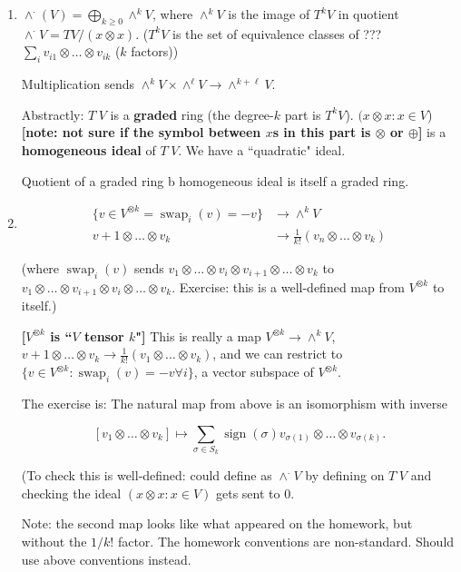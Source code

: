\begin{exercise}

\begin{enumerate}

\item

\(\wedge^\cdot (V) = \bigoplus_{k \geq 0} \wedge^k V\), where \(\wedge^k V\) is the image of \(T^k V\) in quotient \(\wedge^\cdot V = TV/(x \otimes x)\). (\(T^k V\) is the set of equivalence classes of ??? \(\sum_i v_{i1} \otimes \ldots \otimes v_{ik}\) (\(k\) factors))


Multiplication sends \(\wedge^k V \times \wedge^\ell V \to \wedge^{k + \ell} V\).

Abstractly: \(T^\cdot V\) is a \textbf{graded} ring (the degree-\(k\) part is \(T^k V\)). \((x \otimes x: x \in V\)) \textbf{[note: not sure if the symbol between \(x\)s in this part is \(\otimes\) or \(\oplus\)]} is a \textbf{homogeneous ideal} of \(T^\cdot V\). We have a ``quadratic" ideal.

Quotient of a graded ring b homogeneous ideal is itself a graded ring.

\item 

\begin{align*}
\{v \in V^{\otimes k} = \operatorname{swap}_i(v) = -v\} & \to \wedge^k V
\\ v+1 \otimes \ldots \otimes v_k & \to \frac{1}{k!} (v_n \otimes \ldots \otimes v_k)
\end{align*}

(where \( \operatorname{swap}_i(v) \) sends \(v_1 \otimes \ldots \otimes v_i \otimes v_{i+1} \otimes \ldots \otimes v_k\) to \(v_1 \otimes \ldots \otimes v_{i+1} \otimes v_{i} \otimes \ldots \otimes v_k\). Exercise: this is a well-defined map from \(V^{\otimes k}\) to itself.)

\textbf{[\(V^{\otimes k} \) is ``\(V\) tensor \(k\)"]} This is really a map \(V^{\otimes k} \to \wedge^k V\), \(v+1 \otimes \ldots \otimes v_k \to \frac{1}{k!} (v_1 \otimes \ldots \otimes v_k)\), and we can restrict to \(\{v \in V^{\otimes k} : \operatorname{swap}_i(v) = -v \forall i\}\), a vector subspace of \(V^{\otimes k}\). 

The exercise is: The natural map from above is an isomorphism with inverse 

\[
[v_1 \otimes \ldots \otimes v_k] \mapsto \sum_{\sigma \in S_k} \operatorname{sign}(\sigma) v_{\sigma(1)} \otimes \ldots \otimes v_{\sigma(k)}.
\]

(To check this is well-defined: could define as \(\wedge^\cdot V\) by defining on \(T^\cdot V\) and checking the ideal \((x \otimes x: x \in V)\) gets sent to 0.

Note: the second map looks like what appeared on the homework, but without the \(1/k!\) factor. The homework conventions are non-standard. Should use above conventions instead.

\end{enumerate}

\end{exercise}

